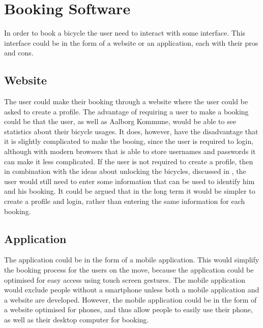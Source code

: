 \section{Booking Software}
In order to book a bicycle the user need to interact with some interface.
This interface could be in the form of a website or an application, each with their pros and cons.

\subsection{Website}
The user could make their booking through a website where the user could be asked to create a profile.
The advantage of requiring a user to make a booking could be that the user, as well as Aalborg Kommune, would be able to see statistics about their bicycle usages.
It does, however, have the disadvantage that it is slightly complicated to make the booing, since the user is required to login, although with modern browsers that is able to store usernames and passwords it can make it less complicated.
If the user is not required to create a profile, then in combination with the ideas about unlocking the bicycles, discussed in , the user would still need to enter some information that can be used to identify him and his booking.
It could be argued that in the long term it would be simpler to create a profile and login, rather than entering the same information for each booking.

\subsection{Application}
The application could be in the form of a mobile application. 
This would simplify the booking process for the users on the move, because the application could be optimised for easy access using touch screen gestures.
The mobile application would exclude people without a smartphone unless both a mobile application and a website are developed.
However, the mobile application could be in the form of a website optimised for phones, and thus allow people to easily use their phone, as well as their desktop computer for booking. 

